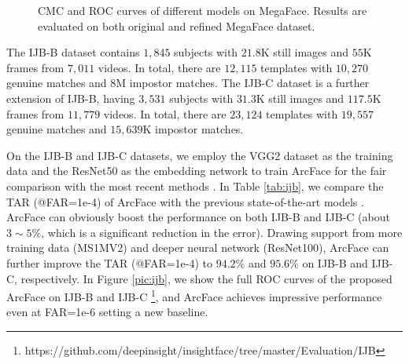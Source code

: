 \documentclass[10pt,twocolumn,letterpaper]{article}
\begin{document}
\begin{figure}[h!]
\centering
{}
\caption{CMC and ROC curves of different models on MegaFace. Results are evaluated on both original and refined MegaFace dataset.}
\vspace{-3mm}
\label{fig:megafacecmcroc}
\end{figure}

 The IJB-B dataset \cite{whitelam2017iarpa} contains $1,845$ subjects with $21.8$K still images and $55$K frames from $7,011$ videos. In total, there are $12,115$ templates with $10,270$ genuine matches and $8$M impostor matches. The IJB-C dataset \cite{whitelam2017iarpa} is a further extension of IJB-B, having $3,531$ subjects with $31.3$K still images and $117.5$K frames from $11,779$ videos. In total, there are $23,124$ templates with $19,557$ genuine matches and $15,639$K impostor matches. 

On the IJB-B and IJB-C datasets, we employ the VGG2 dataset as the training data and the ResNet50 as the embedding network to train ArcFace for the fair comparison with the most recent methods \cite{cao2017vggface2,xie2018multicolumn,xie2018comparator}.
In Table \ref{tab:ijb}, we compare the TAR (@FAR=1e-4) of ArcFace with the previous state-of-the-art models \cite{cao2017vggface2,xie2018multicolumn,xie2018comparator}. ArcFace can obviously boost the performance on both IJB-B and IJB-C (about $3\sim5\%$, which is a significant reduction in the error). Drawing support from more training data (MS1MV2) and deeper neural network (ResNet100), ArcFace can further improve the TAR (@FAR=1e-4) to $94.2\%$ and $95.6\%$ on IJB-B and IJB-C, respectively.
In Figure \ref{pic:ijb}, we show the full ROC curves of the proposed ArcFace on IJB-B and IJB-C \footnote{https://github.com/deepinsight/insightface/tree/master/Evaluation/IJB}, and ArcFace achieves impressive performance even at FAR=1e-6 setting a new baseline. 
\end{document}
